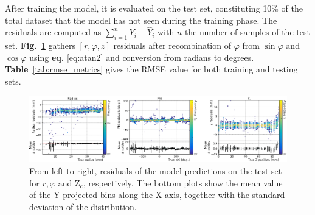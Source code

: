 After training the model, it is evaluated on the test set, constituting 10\% of the total dataset that the model has not seen during the training phase. The residuals are computed as $\sum_{i=1}^n Y_i - \hat Y_i$ 
with $n$ the number of samples of the test set. \textbf{Fig.}~\ref{fig:all_residuals} gathers $[r, \varphi,z]$ residuals after recombination of $\varphi$ from $\sin \varphi$ and $\cos \varphi$ using \textbf{eq.} \ref{eq:atan2} and conversion from radians to degrees. \textbf{Table}~\ref{tab:rmse_metrics} gives the RMSE value for both training and testing sets.
\begin{figure}
\includegraphics[width=\textwidth]{images/residuals_subplots_grouped.eps}
\caption{From left to right, residuals of the model predictions on the test set for $r, \varphi$ and $\text{Z}_\text{c}$, respectively. The bottom plots show the mean value of the Y-projected bins along the X-axis, together with the standard deviation of the distribution.}
\label{fig:all_residuals}       %
\end{figure}


